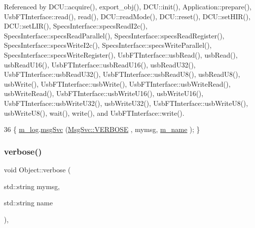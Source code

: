 Referenced by D\+C\+U\+::acquire(), export\+\_\+obj(), D\+C\+U\+::init(), Application\+::prepare(), Usb\+F\+T\+Interface\+::read(), read(), D\+C\+U\+::read\+Mode(), D\+C\+U\+::reset(), D\+C\+U\+::set\+H\+I\+R(), D\+C\+U\+::set\+L\+I\+R(), Specs\+Interface\+::specs\+Read\+I2c(), Specs\+Interface\+::specs\+Read\+Parallel(), Specs\+Interface\+::specs\+Read\+Register(), Specs\+Interface\+::specs\+Write\+I2c(), Specs\+Interface\+::specs\+Write\+Parallel(), Specs\+Interface\+::specs\+Write\+Register(), Usb\+F\+T\+Interface\+::usb\+Read(), usb\+Read(), usb\+Read\+U16(), Usb\+F\+T\+Interface\+::usb\+Read\+U16(), usb\+Read\+U32(), Usb\+F\+T\+Interface\+::usb\+Read\+U32(), Usb\+F\+T\+Interface\+::usb\+Read\+U8(), usb\+Read\+U8(), usb\+Write(), Usb\+F\+T\+Interface\+::usb\+Write(), Usb\+F\+T\+Interface\+::usb\+Write\+Read(), usb\+Write\+Read(), Usb\+F\+T\+Interface\+::usb\+Write\+U16(), usb\+Write\+U16(), Usb\+F\+T\+Interface\+::usb\+Write\+U32(), usb\+Write\+U32(), Usb\+F\+T\+Interface\+::usb\+Write\+U8(), usb\+Write\+U8(), wait(), write(), and Usb\+F\+T\+Interface\+::write().


\begin{DoxyCode}
36 \{ \hyperlink{classObject_a0d269813dd7ac1f24bc143031e2963f2}{m\_log}.\hyperlink{classMsgSvc_ad25f18047920cc59a314e5098259711c}{msgSvc} (\hyperlink{classMsgSvc_ae671eb7301996cd049d2da8a65925926af655256b06494ade5ba830abe5401ec9}{MsgSvc::VERBOSE} , mymsg, \hyperlink{classObject_a8b83c95c705d2c3ba0d081fe1710f48d}{m\_name} ); \}
\end{DoxyCode}
\mbox{\label{classObject_a2d4120195317e2a3c6532e8bb9f3da68}} 
\subsubsection{\texorpdfstring{verbose()}{verbose()}\hspace{0.1cm}{\footnotesize\ttfamily [2/2]}}
{\footnotesize\ttfamily void Object\+::verbose (\begin{DoxyParamCaption}\item[{std\+::string}]{mymsg,  }\item[{std\+::string}]{name }\end{DoxyParamCaption})\hspace{0.3cm}{\ttfamily [inline]}, {\ttfamily [inherited]}}



